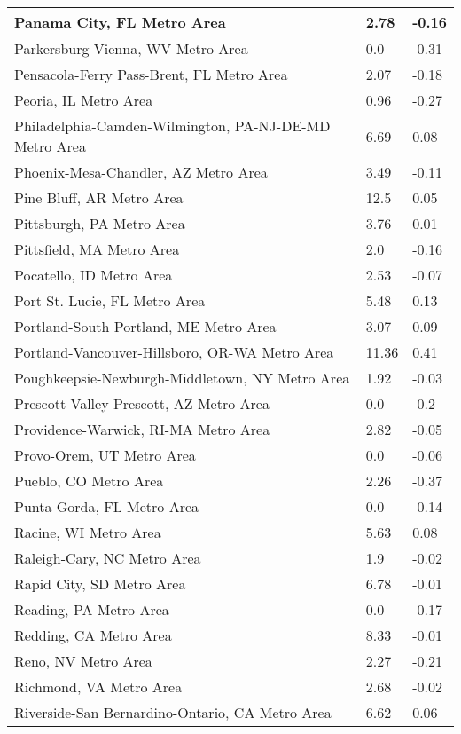 \documentclass[12pt,oneside, letterpaper]{book}
\begin{document}
\begin{longtable}{| p{} | p{} | p{} |}
    Panama City, FL Metro Area & 2.78 & -0.16 \\ \hline
    Parkersburg-Vienna, WV Metro Area & 0.0 & -0.31 \\ \hline
    Pensacola-Ferry Pass-Brent, FL Metro Area & 2.07 & -0.18 \\ \hline
    Peoria, IL Metro Area & 0.96 & -0.27 \\ \hline
    Philadelphia-Camden-Wilmington, PA-NJ-DE-MD Metro Area & 6.69 & 0.08 \\ \hline
    Phoenix-Mesa-Chandler, AZ Metro Area & 3.49 & -0.11 \\ \hline
    Pine Bluff, AR Metro Area & 12.5 & 0.05 \\ \hline
    Pittsburgh, PA Metro Area & 3.76 & 0.01 \\ \hline
    Pittsfield, MA Metro Area & 2.0 & -0.16 \\ \hline
    Pocatello, ID Metro Area & 2.53 & -0.07 \\ \hline
    Port St. Lucie, FL Metro Area & 5.48 & 0.13 \\ \hline
    Portland-South Portland, ME Metro Area & 3.07 & 0.09 \\ \hline
    Portland-Vancouver-Hillsboro, OR-WA Metro Area & 11.36 & 0.41 \\ \hline
    Poughkeepsie-Newburgh-Middletown, NY Metro Area & 1.92 & -0.03 \\ \hline
    Prescott Valley-Prescott, AZ Metro Area & 0.0 & -0.2 \\ \hline
    Providence-Warwick, RI-MA Metro Area & 2.82 & -0.05 \\ \hline
    Provo-Orem, UT Metro Area & 0.0 & -0.06 \\ \hline
    Pueblo, CO Metro Area & 2.26 & -0.37 \\ \hline
    Punta Gorda, FL Metro Area & 0.0 & -0.14 \\ \hline
    Racine, WI Metro Area & 5.63 & 0.08 \\ \hline
    Raleigh-Cary, NC Metro Area & 1.9 & -0.02 \\ \hline
    Rapid City, SD Metro Area & 6.78 & -0.01 \\ \hline
    Reading, PA Metro Area & 0.0 & -0.17 \\ \hline
    Redding, CA Metro Area & 8.33 & -0.01 \\ \hline
    Reno, NV Metro Area & 2.27 & -0.21 \\ \hline
    Richmond, VA Metro Area & 2.68 & -0.02 \\ \hline
    Riverside-San Bernardino-Ontario, CA Metro Area & 6.62 & 0.06 \\ \hline

\end{longtable}
\end{document}
